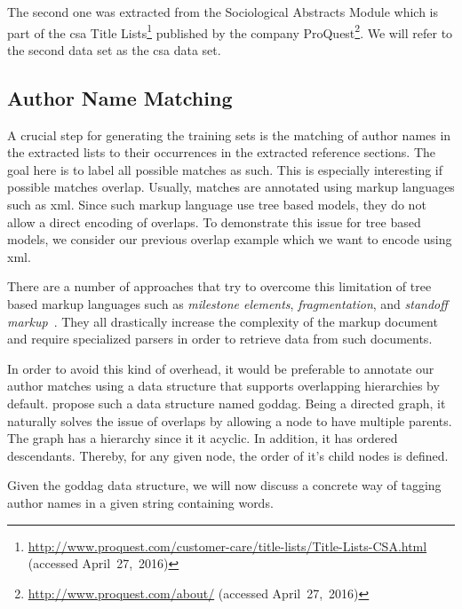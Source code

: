 \bigskip

The second one was extracted from the Sociological Abstracts Module which is part of the \gls{csa} Title Lists\footnote{\url{http://www.proquest.com/customer-care/title-lists/Title-Lists-CSA.html} (accessed April~27,~2016)} published by the company ProQuest\footnote{\url{http://www.proquest.com/about/} (accessed April~27,~2016)}.
We will refer to the second data set as the \gls{csa} data set.


\subsection{Author Name Matching}
A crucial step for generating the training sets is the matching of author names in the extracted lists to their occurrences in the extracted reference sections.
The goal here is to label all possible matches as such.
This is especially interesting if possible matches overlap.
Usually, matches are annotated using markup languages such as \gls{xml}.
Since such markup language use tree based models, they do not allow a direct encoding of overlaps.
To demonstrate this issue for tree based models, we consider our previous overlap example which we want to encode using \gls{xml}\@{}.

There are a number of approaches that try to overcome this limitation of tree based markup languages such as \textit{milestone elements}, \textit{fragmentation}, and \textit{standoff markup}~\citep{sperberg2000goddag}. They all drastically increase the complexity of the markup document and require specialized parsers in order to retrieve data from such documents.

In order to avoid this kind of overhead, it would be preferable to annotate our author matches using a data structure that supports overlapping hierarchies by default.
\citet{sperberg2000goddag} propose such a data structure named \acrfull{goddag}.
Being a directed graph, it naturally solves the issue of overlaps by allowing a node to have multiple parents.
The graph has a hierarchy since it it acyclic.
In addition, it has ordered descendants.
Thereby, for any given node, the order of it's child nodes is defined.

\bigskip

Given the \gls{goddag} data structure, we will now discuss a concrete way of tagging author names in a given string containing words.

